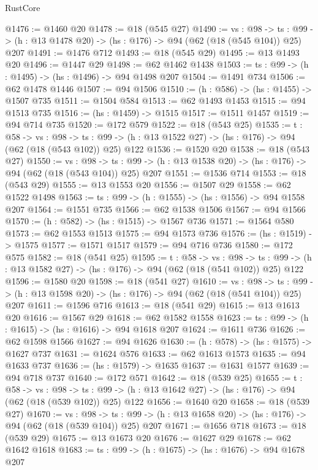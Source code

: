 \begin{lexlean}{RustCore}
\begin{coremodule}
@1476 := @1460 @20
@1478 := @18 (@545 @27)
@1490 := {vs : @98} ->
  {ts : @99} -> (h : @13 @1478 @20) -> (hs : @176) -> @94 (@62 (@18 (@545 @104)) @25) @207
@1491 := @1476 @712
@1493 := @18 (@545 @29)
@1495 := @13 @1493 @20
@1496 := @1447 @29
@1498 := @62 @1462 @1438
@1503 := {ts : @99} -> (h : @1495) -> (hs : @1496) -> @94 @1498 @207
@1504 := @1491 @734
@1506 := @62 @1478 @1446
@1507 := @94 @1506
@1510 := (h : @586) -> (hs : @1455) -> @1507 @735
@1511 := @1504 @584
@1513 := @62 @1493 @1453
@1515 := @94 @1513 @735
@1516 := (hs : @1459) -> @1515
@1517 := @1511 @1457
@1519 := @94 @714 @735
@1520 := @172 @579
@1522 := @18 (@543 @25)
@1535 := {t : @58} ->
  {vs : @98} ->
  {ts : @99} -> (h : @13 @1522 @27) -> (hs : @176) -> @94 (@62 (@18 (@543 @102)) @25) @122
@1536 := @1520 @20
@1538 := @18 (@543 @27)
@1550 := {vs : @98} ->
  {ts : @99} -> (h : @13 @1538 @20) -> (hs : @176) -> @94 (@62 (@18 (@543 @104)) @25) @207
@1551 := @1536 @714
@1553 := @18 (@543 @29)
@1555 := @13 @1553 @20
@1556 := @1507 @29
@1558 := @62 @1522 @1498
@1563 := {ts : @99} -> (h : @1555) -> (hs : @1556) -> @94 @1558 @207
@1564 := @1551 @735
@1566 := @62 @1538 @1506
@1567 := @94 @1566
@1570 := (h : @582) -> (hs : @1515) -> @1567 @736
@1571 := @1564 @580
@1573 := @62 @1553 @1513
@1575 := @94 @1573 @736
@1576 := (hs : @1519) -> @1575
@1577 := @1571 @1517
@1579 := @94 @716 @736
@1580 := @172 @575
@1582 := @18 (@541 @25)
@1595 := {t : @58} ->
  {vs : @98} ->
  {ts : @99} -> (h : @13 @1582 @27) -> (hs : @176) -> @94 (@62 (@18 (@541 @102)) @25) @122
@1596 := @1580 @20
@1598 := @18 (@541 @27)
@1610 := {vs : @98} ->
  {ts : @99} -> (h : @13 @1598 @20) -> (hs : @176) -> @94 (@62 (@18 (@541 @104)) @25) @207
@1611 := @1596 @716
@1613 := @18 (@541 @29)
@1615 := @13 @1613 @20
@1616 := @1567 @29
@1618 := @62 @1582 @1558
@1623 := {ts : @99} -> (h : @1615) -> (hs : @1616) -> @94 @1618 @207
@1624 := @1611 @736
@1626 := @62 @1598 @1566
@1627 := @94 @1626
@1630 := (h : @578) -> (hs : @1575) -> @1627 @737
@1631 := @1624 @576
@1633 := @62 @1613 @1573
@1635 := @94 @1633 @737
@1636 := (hs : @1579) -> @1635
@1637 := @1631 @1577
@1639 := @94 @718 @737
@1640 := @172 @571
@1642 := @18 (@539 @25)
@1655 := {t : @58} ->
  {vs : @98} ->
  {ts : @99} -> (h : @13 @1642 @27) -> (hs : @176) -> @94 (@62 (@18 (@539 @102)) @25) @122
@1656 := @1640 @20
@1658 := @18 (@539 @27)
@1670 := {vs : @98} ->
  {ts : @99} -> (h : @13 @1658 @20) -> (hs : @176) -> @94 (@62 (@18 (@539 @104)) @25) @207
@1671 := @1656 @718
@1673 := @18 (@539 @29)
@1675 := @13 @1673 @20
@1676 := @1627 @29
@1678 := @62 @1642 @1618
@1683 := {ts : @99} -> (h : @1675) -> (hs : @1676) -> @94 @1678 @207

\end{coremodule}
\end{lexlean}

